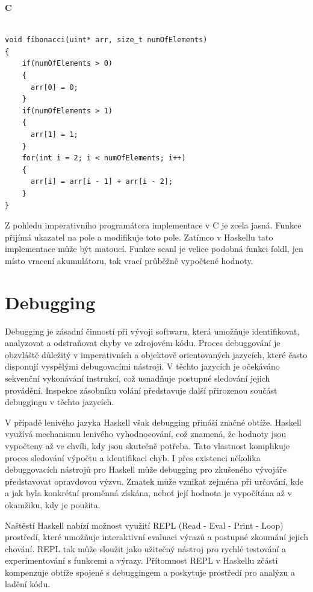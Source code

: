 \documentclass[male,czech]{kithesis}
\begin{document}
\textbf{C}
\begin{verbatim}

void fibonacci(uint* arr, size_t numOfElements)
{
    if(numOfElements > 0)
    {
      arr[0] = 0;
    }
    if(numOfElements > 1)
    {
      arr[1] = 1;
    }
    for(int i = 2; i < numOfElements; i++)
    {
      arr[i] = arr[i - 1] + arr[i - 2];
    }
}

\end{verbatim}

Z pohledu imperativního programátora implementace v C je zcela jasná. Funkce přijímá ukazatel na
pole a modifikuje toto pole. Zatímco v Haskellu tato implementace může být matoucí. Funkce scanl je 
velice podobná funkci foldl, jen místo vracení akumulátoru, tak vrací průběžně vypočtené hodnoty.

\section{Debugging}

Debugging je zásadní činností při vývoji softwaru, která umožňuje identifikovat, 
analyzovat a odstraňovat chyby ve zdrojovém kódu. 
Proces debuggování je obzvláště důležitý v imperativních a objektově orientovaných jazycích, 
které často disponují vyspělými debugovacími nástroji. 
V těchto jazycích je očekáváno sekvenční vykonávání instrukcí, 
což usnadňuje postupné sledování jejich provádění. 
Inspekce zásobníku volání představuje 
další přirozenou součást debuggingu v těchto jazycích.

V případě lenivého jazyka Haskell však debugging přináší značné obtíže. 
Haskell využívá mechanismu lenivého vyhodnocování, což znamená, 
že hodnoty jsou vypočteny až ve chvíli, kdy jsou skutečně potřeba. 
Tato vlastnost komplikuje proces sledování výpočtu a identifikaci chyb. 
I přes existenci několika debuggovacích nástrojů pro Haskell může 
debugging pro zkušeného vývojáře představovat opravdovou výzvu. 
Zmatek může vznikat zejména při určování, 
kde a jak byla konkrétní proměnná získána, 
neboť její hodnota je vypočítána až v okamžiku, 
kdy je použita.

Naštěstí Haskell nabízí možnost využití REPL 
(Read - Eval - Print - Loop) prostředí, 
které umožňuje interaktivní evaluaci výrazů a postupné zkoumání jejich chování. 
REPL tak může sloužit jako užitečný nástroj pro rychlé testování 
a experimentování s funkcemi a výrazy. 
Přítomnost REPL v Haskellu zčásti kompenzuje obtíže spojené 
s debuggingem a poskytuje prostředí pro analýzu a ladění kódu.
\end{document}
